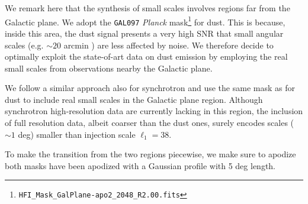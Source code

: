  
We remark here that the synthesis of small scales involves regions far from the Galactic plane.  We adopt the  \texttt{GAL097} \emph{Planck}  mask\footnote{\texttt{HFI\_Mask\_GalPlane-apo2\_2048\_R2.00.fits}} for dust. This is because, inside this area, the dust signal presents a very high SNR that small angular scales (e.g. $\sim20 $ arcmin ) are less affected by noise. We therefore decide to optimally exploit the state-of-art data on dust emission by employing the real small scales from observations nearby the Galactic plane.  

We follow a similar approach also for synchrotron and use the same mask as for dust to include real small scales in the Galactic plane region. Although synchrotron high-resolution data are currently lacking in this region, the inclusion of full resolution data, albeit coarser than the dust ones, surely encodes scales ($\sim 1$ deg) smaller   than   injection scale $\ell_1=38 $.  

To make the transition from the two regions piecewise, we make sure to apodize both masks have been apodized with a Gaussian profile with 5 deg length.






